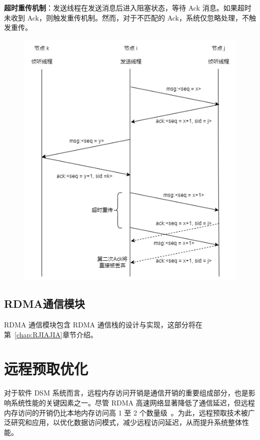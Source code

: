 {\begin{enumerate}[label=\arabic*.]
    \textbf{超时重传机制}：发送线程在发送消息后进入阻塞状态，等待 Ack 消息。如果超时未收到 Ack，则触发重传机制。然而，对于不匹配的 Ack，系统仅忽略处理，不触发重传。
    \begin{figure}[H]
        \centering
        \includegraphics[width=1\textwidth]{Img/M-JIAJIA-reliable-comm.png}
        \label{fig:mjiajia-reliable-comm}
    \end{figure}
    
\end{enumerate}

\subsection{RDMA通信模块}
RDMA 通信模块包含 RDMA 通信栈的设计与实现，这部分将在第~\ref{chap:RJIAJIA}章节介绍。

\section{远程预取优化}
对于软件 DSM 系统而言，远程内存访问开销是通信开销的重要组成部分，也是影响系统性能的关键因素之一。尽管 RDMA 高速网络显著降低了通信延迟，但远程内存访问的开销仍比本地内存访问高 1 至 2 个数量级~\citep{cai2018gam}。为此，远程预取技术被广泛研究和应用，以优化数据访问模式，减少远程访问延迟，从而提升系统整体性能。

}
